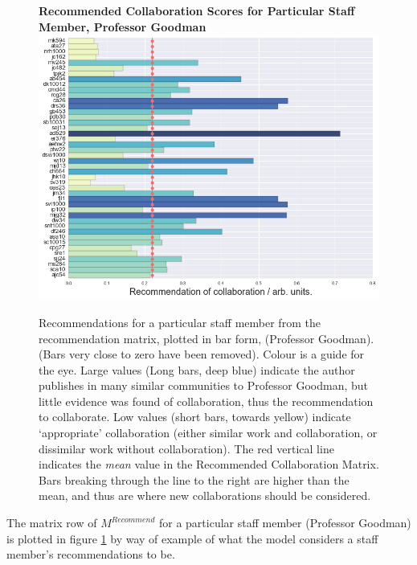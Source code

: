 \begin{center}
\begin{figure}[H]
  \centering
  \textbf{Recommended Collaboration Scores for Particular Staff Member, Professor Goodman}
    \includegraphics[width=\textwidth]{Analysis/jmg_dots_line.png}
    \caption[Recommended Collaboration Scores for Particular Staff Member]{Recommendations for a particular staff member from the recommendation matrix, plotted in bar form, (Professor Goodman). (Bars very close to zero have been removed). Colour is a guide for the eye. Large values (Long bars, deep blue) indicate the author publishes in many similar communities to Professor Goodman, but little evidence was found of collaboration, thus the recommendation to collaborate. Low values (short bars, towards yellow) indicate `appropriate' collaboration (either similar work and collaboration, or dissimilar work without collaboration). The red vertical line indicates the \emph{mean} value in the Recommended Collaboration Matrix. Bars breaking through the line to the right are higher than the mean, and thus are where new collaborations should be considered.}
    \label{fig:RECOMM_BAR}
\end{figure} 
\end{center}
\newpage
The matrix row of $M^{Recommend}$ for a particular staff member (Professor Goodman) is plotted in figure \ref{fig:RECOMM_BAR} by way of example of what the model considers a staff member's recommendations to be.
